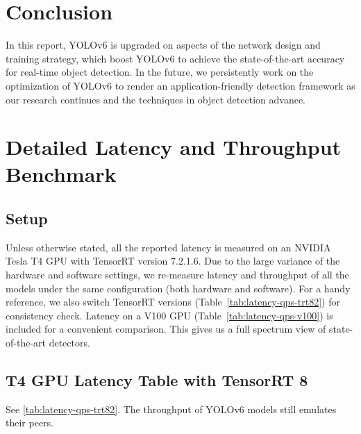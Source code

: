 \documentclass[10pt,twocolumn,letterpaper]{article}
\begin{document}
\section{Conclusion}
In this report, YOLOv6 is upgraded on aspects of the network design and training strategy, which boost  YOLOv6 to achieve the state-of-the-art accuracy for real-time object detection. In the future, we persistently work on the optimization of YOLOv6 to render an application-friendly detection framework as our research continues and the techniques in object detection advance.

{\small


}

\clearpage

\appendix

\section{Detailed Latency and Throughput Benchmark}\label{app:bench}
\subsection{Setup}
Unless otherwise stated, all the reported latency is measured on an NVIDIA Tesla T4 GPU with TensorRT version 7.2.1.6. Due to the large variance of the hardware and software settings, we re-measure latency and throughput of all the models under the same configuration (both hardware and software). For a handy reference, we also switch TensorRT versions (Table~\ref{tab:latency-qps-trt82}) for consistency check. Latency on a V100 GPU (Table~\ref{tab:latency-qps-v100}) is included for a convenient comparison. This gives us a full spectrum view of state-of-the-art detectors.

\subsection{T4 GPU Latency Table with TensorRT 8}

See \cref{tab:latency-qps-trt82}. The throughput of YOLOv6 models still emulates their peers.
\end{document}
